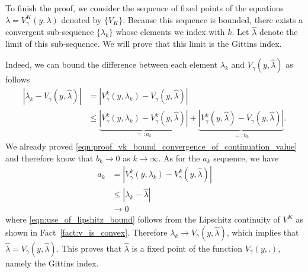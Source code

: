 \begin{myproof}[Proof.]
	{\color{blue}
	To finish the proof, we consider the sequence of fixed points of the equations $\lambda = V^K_\gamma(y, \lambda)$ denoted by $\{V_K\}$. 
	Because this sequence is bounded, there exists a convergent sub-sequence $\{ \lambda_k \}$ whose elements we index with $k$. Let $\hat \lambda$ denote the limit of this sub-sequence. We will prove that this limit is the Gittins index.
	
	Indeed, we can bound the difference between each element $\lambda_k$ and $V_\gamma(y, \hat \lambda)$ as follows
	\begin{align*}
	|\lambda_k - V_\gamma(y, \hat \lambda)| &  = |V^k_\gamma(y, \lambda_k) - V_\gamma(y, \hat \lambda) | \\
	&  \leq \underbrace{|V^k_\gamma(y, \lambda_k) - V^k_\gamma(y, \hat \lambda)|}_{=: a_k} + \underbrace{|V^k_\gamma(y, \hat \lambda) - V_\gamma(y, \hat \lambda)|}_{=:b_k}.
	\end{align*}
	We already proved \eqref{eqn:proof_vk_bound_convergence_of_continuation_value} and therefore know that $b_k \to 0$ as $k \to \infty$. As for the $a_k$ sequence, we have
	\begin{align}
	a_k & = |V^k_\gamma(y, \lambda_k) - V^k_\gamma(y, \hat \lambda)| \nonumber \\
	& \leq | \lambda_k - \hat \lambda | \label{eqn:use_of_lipshitz_bound}\\
	&  \to 0 \nonumber
	\end{align}
	where \eqref{eqn:use_of_lipshitz_bound} follows from the Lipschitz continuity of $V^K$ as shown in Fact~\ref{fact:v_is_convex}. Therefore $\lambda_k \to V_\gamma(y, \hat \lambda)$, which implies that $\hat \lambda = V_\gamma(y, \hat \lambda)$. This proves that $\hat \lambda$ is a fixed point of the function $V_\gamma(y, .)$, namely the Gittins index.
	}
\end{myproof}


